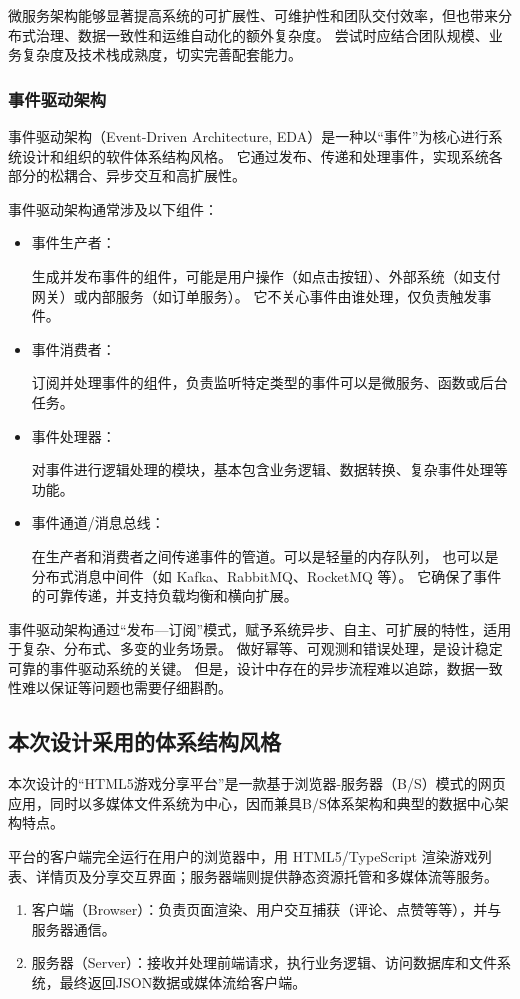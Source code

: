 \documentclass[12pt]{ctexart} %
\begin{document}
微服务架构能够显著提高系统的可扩展性、可维护性和团队交付效率，但也带来分布式治理、数据一致性和运维自动化的额外复杂度。
尝试时应结合团队规模、业务复杂度及技术栈成熟度，切实完善配套能力。

\subsubsection{事件驱动架构}
事件驱动架构（Event‑Driven Architecture, EDA）是一种以“事件”为核心进行系统设计和组织的软件体系结构风格。
它通过发布、传递和处理事件，实现系统各部分的松耦合、异步交互和高扩展性。

事件驱动架构通常涉及以下组件：
\begin{itemize}
  \item 事件生产者：

  生成并发布事件的组件，可能是用户操作（如点击按钮）、外部系统（如支付网关）或内部服务（如订单服务）。
  它不关心事件由谁处理，仅负责触发事件。
  \item 事件消费者：
  
  订阅并处理事件的组件，负责监听特定类型的事件可以是微服务、函数或后台任务。
  \item 事件处理器：

  对事件进行逻辑处理的模块，基本包含业务逻辑、数据转换、复杂事件处理等功能。
  \item 事件通道/消息总线：

  在生产者和消费者之间传递事件的管道。可以是轻量的内存队列，
  也可以是分布式消息中间件（如 Kafka、RabbitMQ、RocketMQ 等）。
  它确保了事件的可靠传递，并支持负载均衡和横向扩展。
\end{itemize}

事件驱动架构通过“发布—订阅”模式，赋予系统异步、自主、可扩展的特性，适用于复杂、分布式、多变的业务场景。
做好幂等、可观测和错误处理，是设计稳定可靠的事件驱动系统的关键。
但是，设计中存在的异步流程难以追踪，数据一致性难以保证等问题也需要仔细斟酌。

\subsection{本次设计采用的体系结构风格}
本次设计的“HTML5游戏分享平台”是一款基于浏览器-服务器（B/S）模式的网页应用，同时以多媒体文件系统为中心，因而兼具B/S体系架构和典型的数据中心架构特点。

平台的客户端完全运行在用户的浏览器中，用 HTML5/TypeScript 渲染游戏列表、详情页及分享交互界面；服务器端则提供静态资源托管和多媒体流等服务。
\begin{enumerate}
  \item 客户端（Browser）：负责页面渲染、用户交互捕获（评论、点赞等等），并与服务器通信。
  \item 服务器（Server）：接收并处理前端请求，执行业务逻辑、访问数据库和文件系统，最终返回JSON数据或媒体流给客户端。
\end{enumerate}
\end{document}
